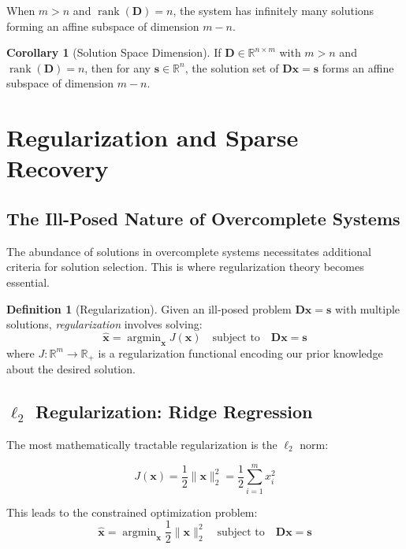 \documentclass[12pt]{article}
\renewcommand{\vec}[1]{\mathbf{#1}}
\DeclareMathOperator{\rank}{rank}
\DeclareMathOperator{\argmin}{argmin}
\newcommand{\R}{\mathbb{R}}
\theoremstyle{definition}
\newtheorem{corollary}[theorem]{Corollary}
\newtheorem{definition}[theorem]{Definition}
\begin{document}
When $m > n$ and $\rank(\mathbf{D}) = n$, the system has infinitely many solutions forming an affine subspace of dimension $m - n$.

\begin{corollary}[Solution Space Dimension]
    If $\mathbf{D} \in \R^{n \times m}$ with $m > n$ and $\rank(\mathbf{D}) = n$, then for any $\vec{s} \in \R^n$, the solution set of $\mathbf{D}\vec{x} = \vec{s}$ forms an affine subspace of dimension $m - n$.
\end{corollary}

\newpage

\section{Regularization and Sparse Recovery}

\subsection{The Ill-Posed Nature of Overcomplete Systems}

The abundance of solutions in overcomplete systems necessitates additional criteria for solution selection. This is where regularization theory becomes essential.

\begin{definition}[Regularization]
    Given an ill-posed problem $\mathbf{D}\vec{x} = \vec{s}$ with multiple solutions, \textit{regularization} involves solving:
    \begin{equation}
        \hat{\vec{x}} = \argmin_{\vec{x}} J(\vec{x}) \quad \text{subject to} \quad \mathbf{D}\vec{x} = \vec{s}
    \end{equation}
    where $J: \R^m \to \R_+$ is a regularization functional encoding our prior knowledge about the desired solution.
\end{definition}

\subsection{$\ell_2$ Regularization: Ridge Regression}

The most mathematically tractable regularization is the $\ell_2$ norm:

\begin{equation}
    J(\vec{x}) = \frac{1}{2}\|\vec{x}\|_2^2 = \frac{1}{2}\sum_{i=1}^{m} x_i^2
\end{equation}

This leads to the constrained optimization problem:
\begin{equation}
    \hat{\vec{x}} = \argmin_{\vec{x}} \frac{1}{2}\|\vec{x}\|_2^2 \quad \text{subject to} \quad \mathbf{D}\vec{x} = \vec{s}
\end{equation}
\end{document}
